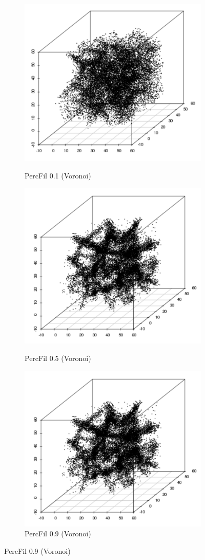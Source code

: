 \documentclass[12pt]{article}
\begin{document}
\begin{center}
  \begin{figure}[htp!]
    \centering
    \begin{subfigure}{.32\textwidth}
      \centering
      \caption{PercFil 0.1 (Voronoi)} \includegraphics[width=0.6\linewidth]{percfil01voronoi.pdf}
      \label{fig:percfil01voronoi}
    \end{subfigure}
      \begin{subfigure}{.32\textwidth}
      \centering
      \caption{PercFil 0.5 (Voronoi)} \includegraphics[width=0.6\linewidth]{percfil09voronoi.pdf}
      \label{fig:percfil09voronoi}
    \end{subfigure}
      \begin{subfigure}{.32\textwidth}
      \centering
      \caption{PercFil 0.9 (Voronoi)} \includegraphics[width=0.6\linewidth]{percfil09voronoi.pdf}

\end{subfigure}
\end{figure}
\end{center}
\end{document}
